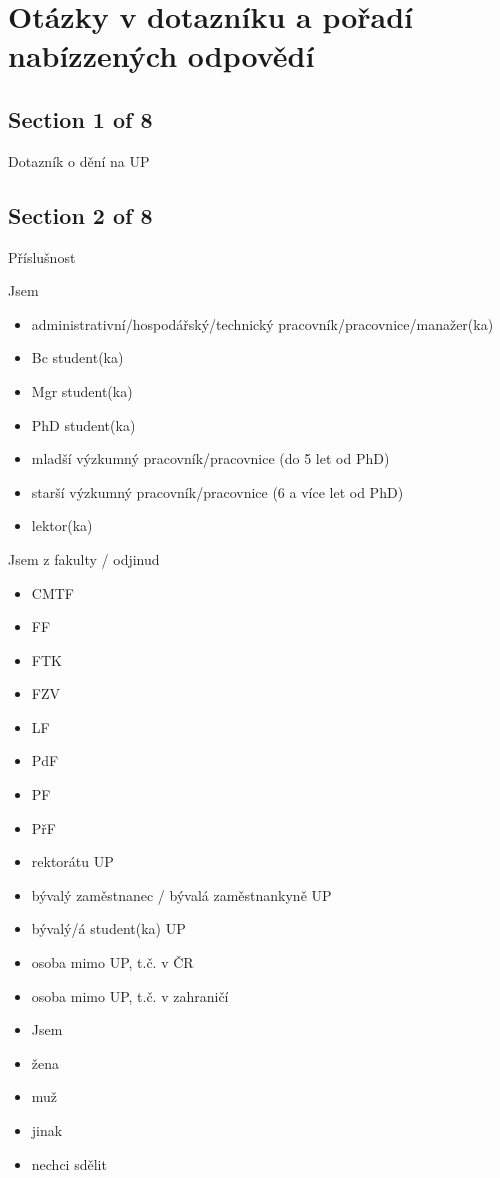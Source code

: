 \section{Otázky v dotazníku a pořadí nabízzených odpovědí}

\subsection{Section 1 of 8}
Dotazník o dění na UP

\subsection{Section 2 of 8}
Příslušnost

Jsem
\begin{itemize}
      \item administrativní/hospodářský/technický pracovník/pracovnice/manažer(ka)
      \item Bc student(ka)
      \item Mgr student(ka)
      \item PhD student(ka)
      \item mladší výzkumný pracovník/pracovnice (do 5 let od PhD)
      \item starší výzkumný pracovník/pracovnice (6 a více let od PhD)
      \item lektor(ka)
\end{itemize}
        
Jsem z fakulty / odjinud
\begin{itemize}
      \item CMTF
      \item FF
      \item FTK
      \item FZV
      \item LF
      \item PdF
      \item PF
      \item PřF
      \item rektorátu UP
      \item bývalý zaměstnanec / bývalá zaměstnankyně UP
      \item bývalý/á student(ka) UP
      \item osoba mimo UP, t.č. v ČR
      \item osoba mimo UP, t.č. v zahraničí
      \item Jsem
      \item žena
      \item muž
      \item jinak
      \item nechci sdělit
\end{itemize}

